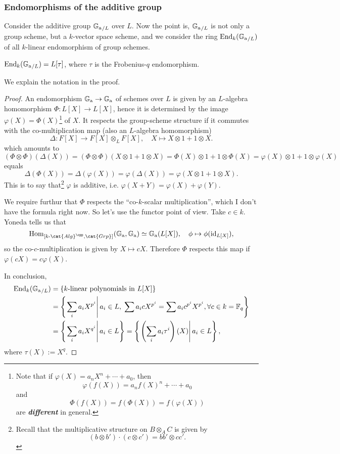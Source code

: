 \documentclass{article}
\newcommand{\F}{\mathbb{F}}
\begin{document}
\subsubsection{Endomorphisms of the additive group}
Consider the additive group ${\mathbb{G}_{\mathrm{a}}}_{/L}$ over $L$.
Now the point is, ${\mathbb{G}_{\mathrm{a}}}_{/L}$ is not only a group scheme, but a $k$-vector space scheme,
and we consider the ring $\operatorname{End}_{k}({\mathbb{G}_{\mathrm{a}}}_{/L})$ of all $k$-linear endomorphism of group schemes.
\begin{proposition}
    $\operatorname{End}_{k}({\mathbb{G}_{\mathrm{a}}}_{/L}) = L[\tau]$, where $\tau$ is the Frobenius-$q$ endomorphism.
\end{proposition}
We explain the notation in the proof.
\begin{proof}
    An endomorphism ${\mathbb{G}_{\mathrm{a}}}\to{\mathbb{G}_{\mathrm{a}}}$ of schemes over $L$ is given by an $L$-algebra homomorphism $\Phi: L[X]\to L[X]$,
    hence it is determined by the image $\varphi(X) = \Phi(X)$\footnote{
        Note that if $\varphi(X) = a_nX^n + \cdots + a_0$,
        then \[\varphi(f(X)) = a_nf(X)^n  + \cdots + a_0\] and
        \[\Phi(f(X)) = f(\Phi(X)) = f(\varphi(X))\] are \textit{\textbf{different}} in general.
    } of $X$.
    It respects the group-scheme structure if it commutes with the co-multiplication map (also an $L$-algebra homomorphism) \[\Delta : F[X]\to F[X]\otimes_L F[X],\quad X\mapsto X\otimes 1 + 1\otimes X.\]
    which amounts to\[(\Phi\otimes\Phi)(\Delta(X)) = (\Phi\otimes\Phi)(X\otimes 1 + 1\otimes X) =  \Phi(X)\otimes 1 + 1\otimes\Phi(X) = 
    \varphi(X)\otimes 1 + 1\otimes\varphi(X)\]
    equals \[\Delta(\Phi(X)) = \Delta(\varphi(X)) = \varphi(\Delta(X)) = \varphi(X\otimes 1 + 1\otimes X).\]
    This is to say that\footnote{
        Recall that the multiplicative structure on $B\otimes_A C$ is given by \[(b\otimes b')\cdot(c\otimes c') = bb'\otimes cc'.\]
    } $\varphi$ is additive, i.e. $\varphi(X+Y) = \varphi(X) + \varphi(Y)$.

    We require furthur that $\Phi$ respects the ``co-$k$-scalar multiplication'', which I don't have the formula right now.
    So let's use the functor point of view.
    Take $c\in k$.
    Yoneda tells us that
    \[\Hom_{[k\text{-}\cat{Alg}^\opp, \cat{Grp}]}(\Ga, \Ga) \simeq \Ga(L[X]), \quad \phi\mapsto \phi(\Id_{L[X]}),\]
    so the co-$c$-multiplication is given by $X\mapsto cX$.
    Therefore $\Phi$ respects this map if $\varphi(cX) = c\varphi(X)$.

    In conclusion,
    \begin{align*}
        \enom_{k}(\Ga_{/L}) &= \{k\text{-linear polynomials in } L[X] \}\\
        &= \left\{\left.\sum_{i}a_i X^{p^i}\right|a_i\in L,\;\sum a_icX^{p^i} = \sum a_ic^{p^i}X^{p^i},\forall c\in k = \F_q\right\}\\
        &= \left\{ \left.\sum_{i}a_i X^{q^i}\right| a_i\in L \right\}
        = \left\{ \left.\left( \sum_{i}a_i \tau^{i} \right)(X)\right| a_i\in L \right\},
    \end{align*}
    where $\tau(X) := X^q$.


\end{proof}
\end{document}
